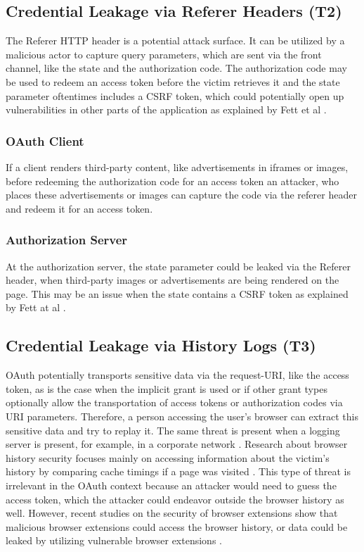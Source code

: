 \documentclass[
    fontsize=12pt,
    headings=small,
    parskip=half,           %
    bibliography=totoc,
    numbers=noenddot,       %
    open=any,               %
    ]{scrreprt}
\begin{document}
\subsection[Credential Leakage via Referer Headers]{Credential Leakage via Referer Headers (T2)}
\label{threat:T2}
The Referer HTTP header is a potential attack surface. It can be utilized by a
malicious actor to capture query parameters, which are sent via the front
channel, like the state and the authorization code. The authorization code may
be used to redeem an access token before the victim retrieves it and the state
parameter oftentimes includes a CSRF token, which could potentially open up
vulnerabilities in other parts of the application as explained by Fett et al
\cite{fett2016comprehensive}.

\subsubsection{OAuth Client}
If a client renders third-party content, like advertisements in iframes or
images, before redeeming the authorization code for an access token an
attacker, who places these advertisements or images can capture the code via
the referer header and redeem it for an access token.

\subsubsection{Authorization Server}
At the authorization server, the state parameter could be leaked via the
Referer header, when third-party images or advertisements are being rendered on
the page. This may be an issue when the state contains a CSRF token as
explained by Fett at al \cite{fett2016comprehensive}.


\subsection[Credential Leakage via History Logs]{Credential Leakage via History Logs (T3)}
\label{threat:T3}
OAuth potentially transports sensitive data via the request-URI, like the access token, as is the case when the implicit grant is used or if other grant types optionally allow the transportation of access tokens or authorization codes via URI parameters. Therefore, a person accessing the user's browser can extract this sensitive data and try to replay it. The same threat is present when a logging server is present, for example, in a corporate network \cite{lodderstedt2020oauth}. Research about browser history security focuses mainly on accessing information about the victim's history by comparing cache timings if a page was visited \cite{bansalcache}. This type of threat is irrelevant in the OAuth context because an attacker would need to guess the access token, which the attacker could endeavor outside the browser history as well. However, recent studies on the security of browser extensions show that malicious browser extensions could access the browser history, or data could be leaked by utilizing vulnerable browser extensions \cite{eriksson2022}.
\end{document}
